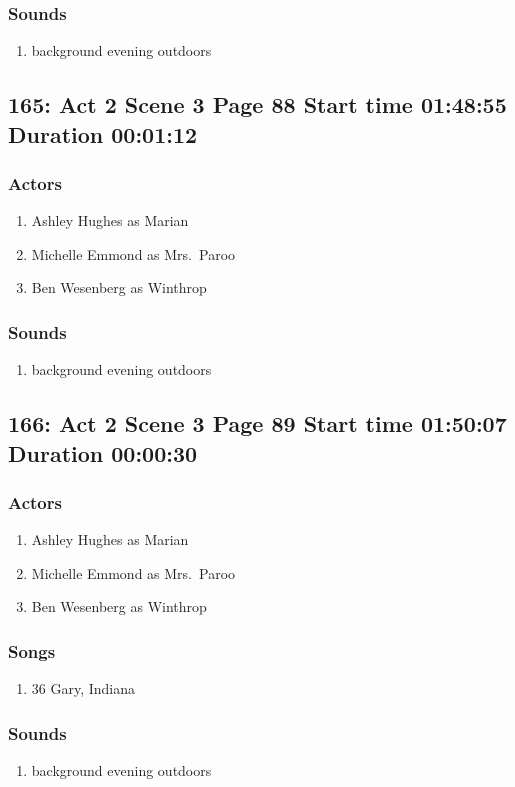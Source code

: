 \subsubsection{Sounds}
\begin{enumerate}
\item background evening outdoors
\end{enumerate}
\subsection{165: Act 2 Scene 3 Page 88 Start time 01:48:55 Duration 00:01:12}

\subsubsection{Actors}
\begin{enumerate}
\item Ashley Hughes as Marian
\item Michelle Emmond as Mrs.~Paroo
\item Ben Wesenberg as Winthrop
\end{enumerate}

\subsubsection{Sounds}
\begin{enumerate}
\item background evening outdoors
\end{enumerate}
\subsection{166: Act 2 Scene 3 Page 89 Start time 01:50:07 Duration 00:00:30}

\subsubsection{Actors}
\begin{enumerate}
\item Ashley Hughes as Marian
\item Michelle Emmond as Mrs.~Paroo
\item Ben Wesenberg as Winthrop
\end{enumerate}

\subsubsection{Songs}
\begin{enumerate}
\item 36 Gary, Indiana
\end{enumerate}\subsubsection{Sounds}
\begin{enumerate}
\item background evening outdoors
\end{enumerate}
